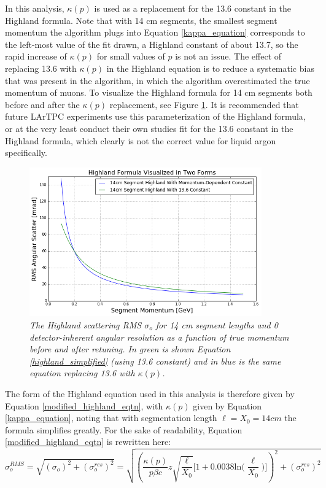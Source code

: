 In this analysis, $\kappa(p)$ is used as a replacement for the 13.6 constant in the Highland formula. Note that with 14 cm segments, the smallest segment momentum the algorithm plugs into Equation \ref{kappa_equation} corresponds to the left-most value of the fit drawn, a Highland constant of about 13.7, so the rapid increase of $\kappa(p)$ for small values of $p$ is not an issue. The effect of replacing 13.6 with $\kappa(p)$ in the Highland equation is to reduce a systematic bias that was present in the algorithm, in which the algorithm overestimated the true momentum of muons. To visualize the Highland formula for 14 cm segments both before and after the $\kappa(p)$ replacement, see Figure \ref{retune_highland_fig4}. It is recommended that future LArTPC experiments use this parameterization of the Highland formula, or at the very least conduct their own studies fit for the 13.6 constant in the Highland formula, which clearly is not the correct value for liquid argon specifically.\\

\begin{figure}[ht!]
\begin{center}
\includegraphics[width=100mm]{Figures/highland_formula_visualized_twoforms.png}
\end{center}
\caption{\textit{The Highland scattering RMS $\sigma_o$ for 14 cm segment lengths and 0 detector-inherent angular resolution as a function of true momentum before and after retuning. In green is shown Equation \ref{highland_simplified} (using 13.6 constant) and in blue is the same equation replacing 13.6 with $\kappa(p)$.}}
\label{retune_highland_fig4}
\end{figure}



The form of the Highland equation used in this analysis is therefore given by Equation \ref{modified_highland_eqtn}, with $\kappa(p)$ given by Equation \ref{kappa_equation}, noting that with segmentation length $\ell = X_0 = 14 cm$ the formula simplifies greatly. For the sake of readability, Equation \ref{modified_highland_eqtn} is rewritten here:
\begin{equation}
\sigma_{o}^{RMS} = \sqrt{ (\sigma_o)^2 + (\sigma_o^{res})^2} = \sqrt{ (\frac{\kappa(p)}{p\beta c}z\sqrt{\frac{\ell}{X_0}}\Big[1+0.0038\text{ln}\Big(\frac{\ell}{X_0}\Big)\Big])^2 + (\sigma_o^{res})^2 }
\end{equation}

